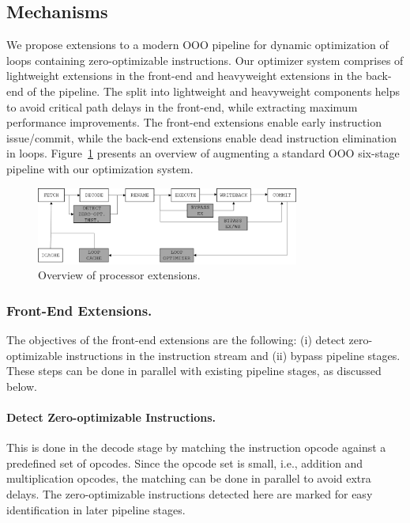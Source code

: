 \subsection{Mechanisms}
We propose extensions to a modern OOO pipeline for dynamic optimization of loops containing zero-optimizable instructions.  Our optimizer system comprises of lightweight extensions in the front-end and heavyweight extensions in the back-end of the pipeline.  The split into lightweight and heavyweight components helps to avoid critical path delays in the front-end, while extracting maximum performance improvements.  The front-end extensions enable early instruction issue/commit, while the back-end extensions enable dead instruction elimination in loops.  Figure~\ref{fig:opt_pipeline} presents an overview of augmenting a standard OOO six-stage pipeline with our optimization system.

\begin{figure}
\centering
\includegraphics[height=1in]{Figures/pipeline.png}
\caption{Overview of processor extensions.}
\label{fig:opt_pipeline}
\end{figure}

\subsubsection{Front-End Extensions.}
The objectives of the front-end extensions are the following: (i) detect zero-optimizable instructions in the instruction stream and (ii) bypass pipeline stages.  These steps can be done in parallel with existing pipeline stages, as discussed below.  

\paragraph{Detect Zero-optimizable Instructions.}
This is done in the decode stage by matching the instruction opcode against a predefined set of opcodes. Since the opcode set is small, i.e., addition and multiplication opcodes, the matching can be done in parallel to avoid extra delays.  The zero-optimizable instructions detected here are marked for easy identification in later pipeline stages. 

